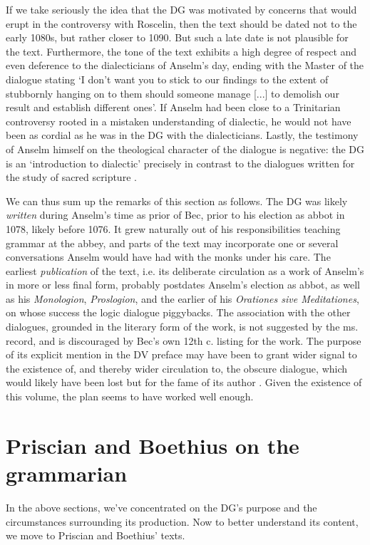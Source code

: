 \documentclass[]{article}
\begin{document}
If we take seriously the idea that the DG was motivated by concerns that would erupt in the controversy with Roscelin, then the text should be dated not to the early 1080s, but rather closer to 1090. But such a late date is not plausible for the text. Furthermore, the tone of the text exhibits a high degree of respect and even deference to the dialecticians of Anselm's day, ending with the Master of the dialogue stating `I don't want you to stick to our findings to the extent of stubbornly hanging on to them should someone manage [...] to demolish our result and establish different ones'\cite[DG ch. 21, p. 80]{Anselm1974}. If Anselm had been close to a Trinitarian controversy rooted in a mistaken understanding of dialectic, he would not have been as cordial as he was in the DG with the dialecticians. Lastly, the testimony of Anselm himself on the theological character of the dialogue is negative: the DG is an `introduction to dialectic' precisely in contrast to the dialogues written for the study of sacred scripture \cite[DV prol.]{AnselmDV}.

We can thus sum up the remarks of this section as follows. The DG was likely \textit{written} during Anselm's time as prior of Bec, prior to his election as abbot in 1078, likely before 1076. It grew naturally out of his responsibilities teaching grammar at the abbey, and parts of the text may incorporate one or several conversations Anselm would have had with the monks under his care. The earliest \textit{publication} of the text, i.e. its deliberate circulation as a work of Anselm's in more or less final form, probably postdates Anselm's election as abbot, as well as his \textit{Monologion}, \textit{Proslogion}, and the earlier of his \textit{Orationes sive Meditationes}, on whose success the logic dialogue piggybacks. The association with the other dialogues, grounded in the literary form of the work, is not suggested by the ms. record, and is discouraged by Bec's own 12th c. listing for the work. The purpose of its explicit mention in the DV preface may have been to grant wider signal to the existence of, and thereby wider circulation to, the obscure dialogue, which would likely have been lost but for the fame of its author \cite[p. 16]{Southern1963}. Given the existence of this volume, the plan seems to have worked well enough.
\section{Priscian and Boethius on the grammarian}
In the above sections, we've concentrated on the DG's purpose and the circumstances surrounding its production. Now to better understand its content, we move to Priscian and Boethius' texts.
\end{document}
